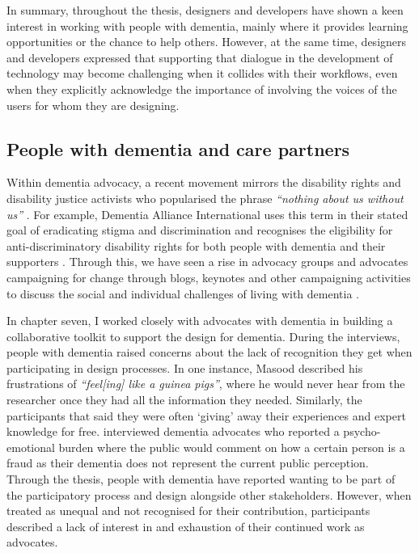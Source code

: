 In summary, throughout the thesis, designers and developers have shown a keen interest in working with people with dementia, mainly where it provides learning opportunities or the chance to help others. However, at the same time, designers and developers expressed that supporting that dialogue in the development of technology may become challenging when it collides with their workflows, even when they explicitly acknowledge the importance of involving the voices of the users for whom they are designing.

\subsection{People with dementia and care partners}
\label{PwDInterests}
Within dementia advocacy, a recent movement mirrors the disability rights and disability justice activists who popularised the phrase \textit{``nothing about us without us''} \citep{spiel_nothing_2020}. For example, Dementia Alliance International uses this term in their stated goal of eradicating stigma and discrimination and recognises the eligibility for anti-discriminatory disability rights for both people with dementia and their supporters \citep{oldfield2021nothing}. Through this, we have seen a rise in advocacy groups and advocates campaigning for change through blogs, keynotes and other campaigning activities to discuss the social and individual challenges of living with dementia \citep{thomas2018dementia}.

In chapter seven, I worked closely with advocates with dementia in building a collaborative toolkit to support the design for dementia. During the interviews, people with dementia raised concerns about the lack of recognition they get when participating in design processes. In one instance, Masood described his frustrations of \textit{``feel[ing] like a guinea pigs''}, where he would never hear from the researcher once they had all the information they needed. Similarly, the participants that said they were often `giving' away their experiences and expert knowledge for free. \cite{wiersma2016creating} interviewed dementia advocates who reported a psycho-emotional burden where the public would comment on how a certain person is a fraud as their dementia does not represent the current public perception. Through the thesis, people with dementia have reported wanting to be part of the participatory process and design alongside other stakeholders. However, when treated as unequal and not recognised for their contribution, participants described a lack of interest in and exhaustion of their continued work as advocates. 

